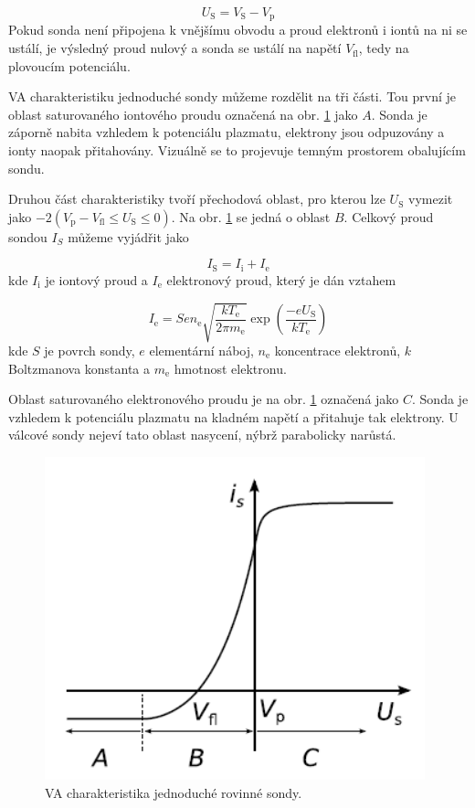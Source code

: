 \documentclass[a4paper,12pt]{article}
\begin{document}
\begin{equation}
	U_\text{S} = V_\text{S} - V_\text{p}
	\label{Usondy}
\end{equation}
Pokud sonda není připojena k vnějšímu obvodu a proud elektronů i iontů na ni se ustálí, je výsledný proud nulový a sonda se ustálí na napětí $V_\text{{fl}}$, tedy na plovoucím potenciálu.

VA charakteristiku jednoduché sondy můžeme rozdělit na tři části. Tou první je oblast saturovaného iontového proudu označená na obr. \ref{VA} jako $A$. Sonda je záporně nabita vzhledem k potenciálu plazmatu, elektrony jsou odpuzovány a ionty naopak přitahovány. Vizuálně se to projevuje temným prostorem obalujícím sondu.

Druhou část charakteristiky tvoří přechodová oblast, pro kterou lze $U_\text{S}$ vymezit jako $-2(V_\text{p} - V_\text{{fl}} \leq U_\text{S} \leq 0)$. Na obr. \ref{VA} se jedná o oblast $B$. Celkový proud sondou $I_S$ můžeme vyjádřit jako

\begin{equation}
	I_\text{S} = I_\text{i} + I_\text{e}
\end{equation}
kde $I_\text{i}$ je iontový proud a $I_\text{e}$ elektronový proud, který je dán vztahem

\begin{equation}
	I_\text{e} = S e n_\text{e} \sqrt{\frac{k T_\text{e}}{2 \pi m_\text{e}}} \exp \left(\frac{-eU_\text{S}}{k T_\text{e}}\right)
	\label{eproud}
\end{equation}
kde $S$ je povrch sondy, $e$ elementární náboj, $n_\text{e}$ koncentrace elektronů, $k$ Boltzmanova konstanta a $m_\text{e}$ hmotnost elektronu.

Oblast saturovaného elektronového proudu je na obr. \ref{VA} označená jako $C$. Sonda je vzhledem k potenciálu plazmatu na kladném napětí a přitahuje tak elektrony. U válcové sondy nejeví tato oblast nasycení, nýbrž parabolicky narůstá.


\begin{figure}[h]
	\centering
	\includegraphics[width=110mm]{VA.png}
	\caption{VA charakteristika jednoduché rovinné sondy.}
	\label{VA}
\end{figure}	
\end{document}

